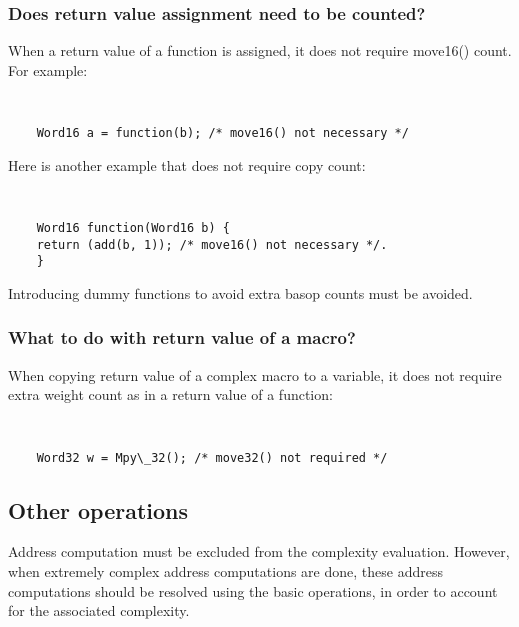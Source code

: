 \subsubsection{Does return value assignment need to be counted?}
When a return value of a function is assigned, it does not require
move16() count. For example:
{\tt\small
\begin{verbatim}
    Word16 a = function(b); /* move16() not necessary */
\end{verbatim}
}%
Here is another example that does not require copy count:
{\tt\small
\begin{verbatim}
    Word16 function(Word16 b) {
    return (add(b, 1)); /* move16() not necessary */.
    }
\end{verbatim}
}%

Introducing dummy functions to avoid extra basop
counts must be avoided. %
%

\subsubsection{What to do with return value of a macro?}
When copying return value of a complex macro to a variable, it does
not require extra weight count as in a return value of a function:
{\tt\small
\begin{verbatim}
    Word32 w = Mpy\_32(); /* move32() not required */
\end{verbatim}
} %

\subsection{Other operations}

Address computation must be excluded from the complexity
evaluation. However, when extremely complex address computations
are done, these address computations should be resolved using the
basic operations, in order to account for the associated
complexity.

